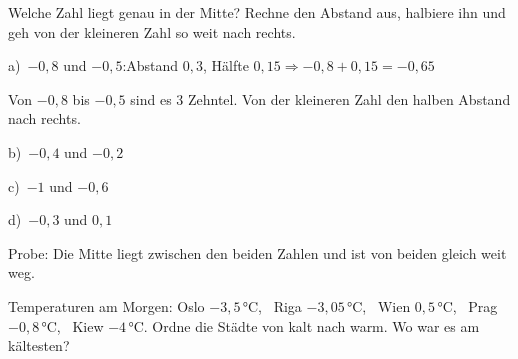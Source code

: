 \documentclass[11pt]{article}
\makeatletter
\providecommand{\grau}[1]{{\color{mbgrau}#1}}
\newcommand{\aufg}[3]{\par\noindent\makebox[0pt][r]{#3}\begin{minipage}[t]{\linewidth}#1\end{minipage}\par}
\newcommand{\nr}[1]{\makebox[7mm][l]{\textbf{#1}}}
\newlength{\kr}
\newcommand{\karomerk}[2]{\protected@write\@auxout{}{\string\karoseite{#1}{#2}{\thepage}}}
\newcommand{\karoseite}[3]{\expandafter\xdef\csname karo@#1@#2\endcsname{#3}}
\makeatother
\begin{document}
\medskip
\aufg{\nr{3.}\begin{minipage}[t]{\dimexpr\linewidth-7mm\relax}Welche Zahl liegt genau in der Mitte? Rechne den Abstand aus, halbiere ihn und geh von der kleineren Zahl so weit nach rechts.\par\smallskip
\grau{a)\ $-0{,}8$ und $-0{,}5$:\quad Abstand $0{,}3$, Hälfte $0{,}15$\quad$\Rightarrow$\quad $-0{,}8 + 0{,}15 = -0{,}65$}\par{\small Von $-0{,}8$ bis $-0{,}5$ sind es 3 Zehntel. Von der kleineren Zahl den halben Abstand nach rechts.}\par\medskip
\noindent\begin{minipage}[t]{0.48\linewidth}\raggedright
b)\ $-0{,}4$ und $-0{,}2$
\end{minipage}\hfill
\begin{minipage}[t]{0.48\linewidth}\raggedright
c)\ $-1$ und $-0{,}6$
\end{minipage}\par\smallskip
\noindent\begin{minipage}[t]{0.48\linewidth}\raggedright
d)\ $-0{,}3$ und $0{,}1$
\end{minipage}\par\smallskip
\par{\small Probe: Die Mitte liegt zwischen den beiden Zahlen und ist von beiden gleich weit weg.}\end{minipage}}{}{}
\medskip
\aufg{\nr{4.}Temperaturen am Morgen: Oslo $-3{,}5$\,°C, \ Riga $-3{,}05$\,°C, \ Wien $0{,}5$\,°C, \ Prag $-0{,}8$\,°C, \ Kiew $-4$\,°C. Ordne die Städte von kalt nach warm. Wo war es am kältesten?}{}{{\scriptsize\color{mbgrau}Ziel\hspace{2mm}}}
\medskip
\par\vspace{3mm}\setlength{\kr}{\dimexpr\pagegoal-\pagetotal-10mm\relax}%
\ifdim\kr>12mm\karomerk{k}{B}\noindent{\scriptsize\color{mbgrau}Platz zum Rechnen}\par\nointerlineskip\vspace{1mm}\noindent
\begin{tikzpicture}\clip (0,0) rectangle ({\linewidth-0.5mm},\kr);\draw[black!16,line width=0.3pt,step=5mm] (0,0) grid (\linewidth,\kr);\end{tikzpicture}\fi\par
\clearpage\label{s:C}\noindent\colorbox{black!12}{}\hspace{3mm}{\Large\bfseries Bruch und Prozent: erst umwandeln}\par\smallskip
\end{document}
